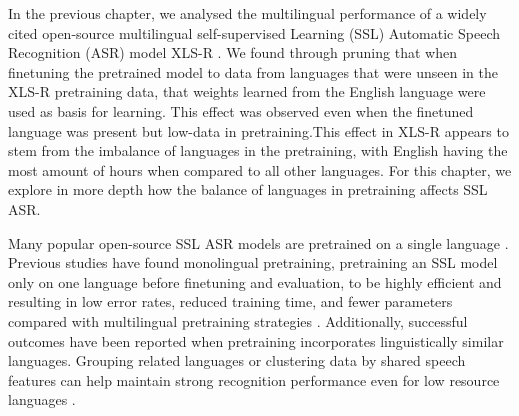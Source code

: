 In the previous chapter, we analysed the multilingual performance of a widely cited open-source multilingual self-supervised Learning (SSL) Automatic Speech Recognition (ASR) model XLS-R \cite{babu2021xlsr}. We found through pruning \cite{frankle2018LTH} that when finetuning the pretrained model to data from languages that were unseen in the XLS-R pretraining data, that weights learned from the English language were used as basis for learning. This effect was observed  even when the finetuned language was present but low-data in pretraining.This effect in XLS-R appears to stem from the imbalance of languages in the pretraining, with English having the most amount of hours when compared to all other languages. For this chapter, we explore in more depth how the balance of languages in pretraining affects SSL ASR.


Many popular open-source SSL ASR models are pretrained on a single language \cite{wav2vec, hsu2021hubert, chen2022wavlm}. Previous studies have found monolingual pretraining, pretraining an SSL model only on one language before finetuning and evaluation, to be highly efficient and resulting in low error rates, reduced training time, and fewer parameters compared with multilingual pretraining strategies \cite{ashihara2023exploration, poncelet2021comparison}. Additionally, successful outcomes have been reported when pretraining incorporates linguistically similar languages. Grouping related languages or clustering data by shared speech features can help maintain strong recognition performance even for low resource languages \cite{zhang2023fast, gupta2021clsril}. %

